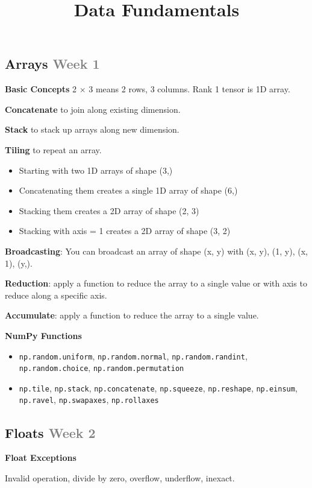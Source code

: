 \documentclass{article}
\title{Data Fundamentals}
\author{}
\date{}
\begin{document}
\subsection*{Arrays \small\textcolor{gray}{Week 1}}

\textbf{Basic Concepts}
2 $\times$ 3 means 2 rows, 3 columns.
Rank 1 tensor is 1D array.

\textbf{Concatenate} to join along existing dimension.

\textbf{Stack} to stack up arrays along new dimension.

\textbf{Tiling} to repeat an array.

\begin{itemize}
    \item Starting with two 1D arrays of shape (3,)
    \item Concatenating them creates a single 1D array of shape (6,)
    \item Stacking them creates a 2D array of shape (2, 3)
    \item Stacking with axis = 1 creates a 2D array of shape (3, 2)
\end{itemize}

\textbf{Broadcasting}: You can broadcast an array of shape (x, y) with (x, y), (1, y), (x, 1), (y,).

\textbf{Reduction}: apply a function to reduce the array to a single value or with axis to reduce along a specific axis.

\textbf{Accumulate}: apply a function to reduce the array to a single value.

\textbf{NumPy Functions}
\begin{itemize}
    \item \texttt{np.random.uniform}, \texttt{np.random.normal}, \texttt{np.random.randint}, \texttt{np.random.choice}, \texttt{np.random.permutation}
    \item \texttt{np.tile}, \texttt{np.stack}, \texttt{np.concatenate}, \texttt{np.squeeze}, \texttt{np.reshape}, \texttt{np.einsum}, \texttt{np.ravel}, \texttt{np.swapaxes}, \texttt{np.rollaxes}
\end{itemize}

\subsection*{Floats \small\textcolor{gray}{Week 2}}

\textbf{Float Exceptions}

Invalid operation, divide by zero, overflow, underflow, inexact.
\end{document}
